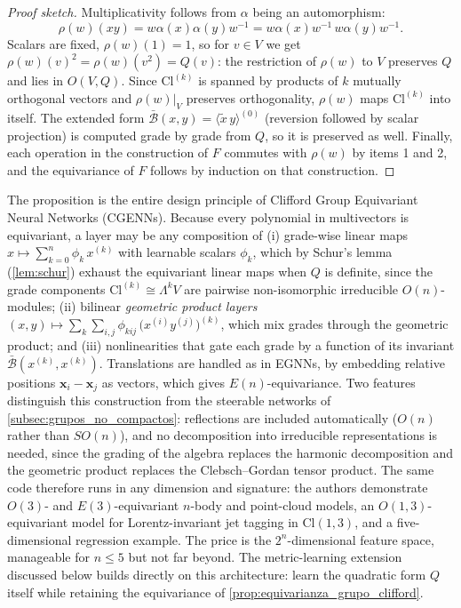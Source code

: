\begin{proof}[Proof sketch]
Multiplicativity follows from $\alpha$ being an automorphism: 
\[\rho(w)(xy) = w\alpha(x)\alpha(y)w^{-1} = w\alpha(x)w^{-1}\,w\alpha(y)w^{-1}.\] Scalars are fixed, $\rho(w)(1) = 1$, so for $v \in V$ we get $\rho(w)(v)^2 = \rho(w)(v^2) = Q(v)$: the restriction of $\rho(w)$ to $V$ preserves $Q$ and lies in $O(V,Q)$. Since $\text{Cl}^{(k)}$ is spanned by products of $k$ mutually orthogonal vectors and $\rho(w)|_V$ preserves orthogonality, $\rho(w)$ maps $\text{Cl}^{(k)}$ into itself. The extended form $\bar{\mathcal{B}}(x,y) = \langle \tilde{x}\,y \rangle^{(0)}$ (reversion followed by scalar projection) is computed grade by grade from $Q$, so it is preserved as well. Finally, each operation in the construction of $F$ commutes with $\rho(w)$ by items 1 and 2, and the equivariance of $F$ follows by induction on that construction.
\end{proof}

The proposition is the entire design principle of Clifford Group Equivariant Neural Networks (CGENNs). Because every polynomial in multivectors is equivariant, a layer may be any composition of (i) grade-wise linear maps $x \mapsto \sum_{k=0}^{n} \phi_k\, x^{(k)}$ with learnable scalars $\phi_k$, which by Schur's lemma (\autoref{lem:schur}) exhaust the equivariant linear maps when $Q$ is definite, since the grade components $\mathrm{Cl}^{(k)} \cong \Lambda^k V$ are pairwise non-isomorphic irreducible $O(n)$-modules; (ii) bilinear \emph{geometric product layers} $(x, y) \mapsto \sum_{k}\sum_{i,j} \phi_{kij}\, \big(x^{(i)} y^{(j)}\big)^{(k)}$, which mix grades through the geometric product; and (iii) nonlinearities that gate each grade by a function of its invariant $\bar{\mathcal{B}}(x^{(k)}, x^{(k)})$. Translations are handled as in EGNNs, by embedding relative positions $\mathbf{x}_i - \mathbf{x}_j$ as vectors, which gives $E(n)$-equivariance. Two features distinguish this construction from the steerable networks of \autoref{subsec:grupos_no_compactos}: reflections are included automatically ($O(n)$ rather than $SO(n)$), and no decomposition into irreducible representations is needed, since the grading of the algebra replaces the harmonic decomposition and the geometric product replaces the Clebsch--Gordan tensor product. The same code therefore runs in any dimension and signature: the authors demonstrate $O(3)$- and $E(3)$-equivariant $n$-body and point-cloud models, an $O(1,3)$-equivariant model for Lorentz-invariant jet tagging in $\text{Cl}(1,3)$, and a five-dimensional regression example. The price is the $2^n$-dimensional feature space, manageable for $n \le 5$ but not far beyond. The metric-learning extension discussed below builds directly on this architecture: \citet{ali2024metriclearning} learn the quadratic form $Q$ itself while retaining the equivariance of \autoref{prop:equivarianza_grupo_clifford}.

